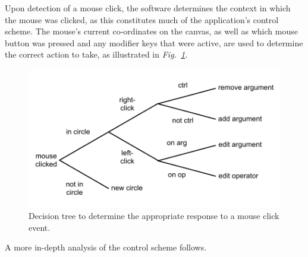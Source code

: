 \documentclass[12pt,twoside,notitlepage,xetex]{report}
\begin{document}
Upon detection of a mouse click, the software determines the context in which the mouse was clicked, as this constitutes much of the application's control scheme.  The mouse's current co-ordinates on the canvas, as well as which mouse button was pressed and any modifier keys that were active, are used to determine the correct action to take, as illustrated in \emph{Fig.~\ref{fig:ClickTree}}.

\begin{center}
\begin{figure}[H]
\begin{center}
\includegraphics[width=\textwidth-4cm]{figs/nico_click.pdf}
\end{center}
\caption{Decision tree to determine the appropriate response to a mouse click event.}
\label{fig:ClickTree}
\end{figure}
\end{center}

A more in-depth analysis of the control scheme follows.
\end{document}
